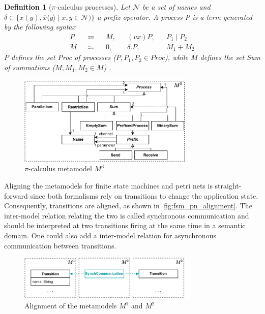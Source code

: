\documentclass[conference]{IEEEtran}
\newtheorem{definition}{Definition}
\begin{document}
\begin{definition}[$\pi$-calculus processes]
    Let $\mathcal{N}$ be a set of names and $\delta \in \{x(y),\overline{x}\langle y \rangle \mid x,y \in \mathcal{N})\}$ a prefix operator.
    A process P is a term generated by the following syntax
    \begin{align*}
        P && \Coloneqq && M, && (vx) P, && P_1 \mid P_2\\
        M && \Coloneqq && 0, && \delta.P, && M_1 + M_2
    \end{align*}
    $P$ defines the set \textit{Proc} of processes ($P, P_1, P_2 \in Proc$), while $M$ defines the set \textit{Sum} of summations ($M, M_1, M_2 \in M$) \cite{gadducciGraphRewritingPcalculus2007}.
\end{definition}

\begin{figure}[h]
    \centering
    \includegraphics[width=3.4in]{pi_metamodel}
    \caption{$\pi$-calculus metamodel $M^3$}
    \label{fig:pi_metamodel}
\end{figure}

Aligning the metamodels for finite state machines and petri nets is straight-forward since both formalisms rely on transitions to change the application state.
Consequently, transitions are aligned, as shown in \autoref{fig:fsm_pn_alignment}.
The inter-model relation relating the two is called synchronous communication and should be interpreted at two transitions firing at the same time in a semantic domain.
One could also add a inter-model relation for asynchronous communication between transitions.

\begin{figure}[h]
    \centering
    \includegraphics[width=3.4in]{fsm_pn_alignment}
    \caption{Alignment of the metamodels $M^1$ and $M^2$}
    \label{fig:fsm_pn_alignment}
\end{figure}
\end{document}
